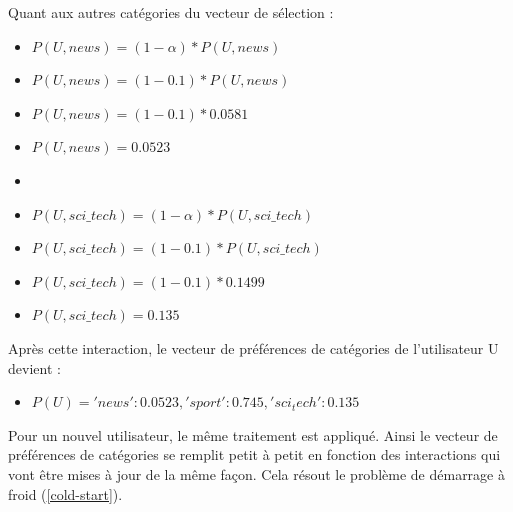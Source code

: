 \begin{enumerate}[leftmargin=*]
            Quant aux autres catégories du vecteur de sélection :
            \begin{itemize}[label={}]
                \item $P(U, news) = (1-{\alpha}) * {P(U, news)} $
                \item $P(U, news) = (1-{0.1}) * {P(U, news)} $
                \item $P(U, news) = (1-{0.1}) * {0.0581} $
                \item $P(U, news) = 0.0523$
                \item 
                \item $P(U, sci\_tech) = (1-{\alpha}) * {P(U, sci\_tech)} $
                \item $P(U, sci\_tech) = (1-{0.1}) * {P(U, sci\_tech)} $
                \item $P(U, sci\_tech) = (1-{0.1}) * {0.1499} $
                \item $P(U, sci\_tech) = 0.135$
            \end{itemize}
            Après cette interaction, le vecteur de préférences de catégories de l'utilisateur U devient :
            \begin{itemize}[label={}]
                \item $P(U) = {'news': 0.0523, 'sport': 0.745, 'sci_tech': 0.135}$\\
            \end{itemize}
            Pour un nouvel utilisateur, le même traitement est appliqué. Ainsi le vecteur de préférences de catégories se remplit petit à petit en fonction des interactions qui vont être mises à jour de la même façon. Cela résout le problème de démarrage à froid (\autoref{cold-start}).
        \end{enumerate}

